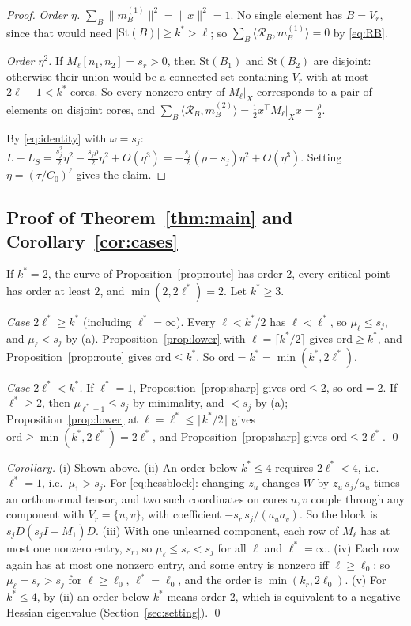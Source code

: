 \documentclass[11pt]{article}
\theoremstyle{definition}
\newcommand{\St}{\mathrm{St}}
\newcommand{\ord}{\mathrm{ord}}
\newcommand{\ip}[2]{\langle #1,#2\rangle}
\begin{document}
\begin{proof}
\emph{Order $\eta$.} $\sum_B\lVert m^{(1)}_B\rVert^2=\lVert x\rVert^2=1$. No single element has $B=V_r$, since that would need
$\lvert\St(B)\rvert\ge k^*>\ell$; so $\sum_B\ip{\mathcal R_B}{m^{(1)}_B}=0$ by \eqref{eq:RB}.

\emph{Order $\eta^2$.} If $M_\ell[n_1,n_2]=s_r>0$, then $\St(B_1)$ and $\St(B_2)$ are disjoint: otherwise their union would be a
connected set containing $V_r$ with at most $2\ell-1<k^*$ cores. So every nonzero entry of $M_\ell|_X$ corresponds to a pair of
elements on disjoint cores, and $\sum_B\ip{\mathcal R_B}{m^{(2)}_B}=\frac12x^\top M_\ell|_Xx=\frac\rho2$.

By \eqref{eq:identity} with $\omega=s_j$: $L-L_S=\frac{s_j^2}{2}\eta^2-\frac{s_j\rho}{2}\eta^2+O(\eta^3)=-\frac{s_j}{2}(\rho-s_j)\eta^2+O(\eta^3)$.
Setting $\eta=(\tau/C_0)^\ell$ gives the claim.
\end{proof}

\subsection{Proof of Theorem~\ref{thm:main} and Corollary~\ref{cor:cases}}

If $k^*=2$, the curve of Proposition~\ref{prop:route} has order $2$, every critical point has order at least $2$, and
$\min(2,2\ell^*)=2$. Let $k^*\ge3$.

\emph{Case $2\ell^*\ge k^*$} (including $\ell^*=\infty$). Every $\ell<k^*/2$ has $\ell<\ell^*$, so $\mu_\ell\le s_j$, and $\mu_\ell<s_j$ by
(a). Proposition~\ref{prop:lower} with $\ell=\lceil k^*/2\rceil$ gives $\ord\ge k^*$, and Proposition~\ref{prop:route} gives
$\ord\le k^*$. So $\ord=k^*=\min(k^*,2\ell^*)$.

\emph{Case $2\ell^*<k^*$.} If $\ell^*=1$, Proposition~\ref{prop:sharp} gives $\ord\le2$, so $\ord=2$. If $\ell^*\ge2$, then
$\mu_{\ell^*-1}\le s_j$ by minimality, and $<s_j$ by (a); Proposition~\ref{prop:lower} at $\ell=\ell^*\le\lceil k^*/2\rceil$ gives
$\ord\ge\min(k^*,2\ell^*)=2\ell^*$, and Proposition~\ref{prop:sharp} gives $\ord\le2\ell^*$. \qed

\emph{Corollary.} (i) Shown above. (ii) An order below $k^*\le4$ requires $2\ell^*<4$, i.e.\ $\ell^*=1$, i.e.\ $\mu_1>s_j$. For
\eqref{eq:hessblock}: changing $z_u$ changes $W$ by $z_u\,s_j/a_u$ times an orthonormal tensor, and two such coordinates on cores
$u,v$ couple through any component with $V_r=\{u,v\}$, with coefficient $-s_r\,s_j/(a_ua_v)$. So the block is
$s_jD(s_jI-M_1)D$. (iii) With one unlearned component, each row of $M_\ell$ has at most one nonzero entry, $s_r$, so
$\mu_\ell\le s_r<s_j$ for all $\ell$ and $\ell^*=\infty$. (iv) Each row again has at most one nonzero entry, and some entry is
nonzero iff $\ell\ge\ell_0$; so $\mu_\ell=s_r>s_j$ for $\ell\ge\ell_0$, $\ell^*=\ell_0$, and the order is $\min(k_r,2\ell_0)$. (v) For
$k^*\le4$, by (ii) an order below $k^*$ means order $2$, which is equivalent to a negative Hessian eigenvalue
(Section~\ref{sec:setting}). \qed
\end{document}
